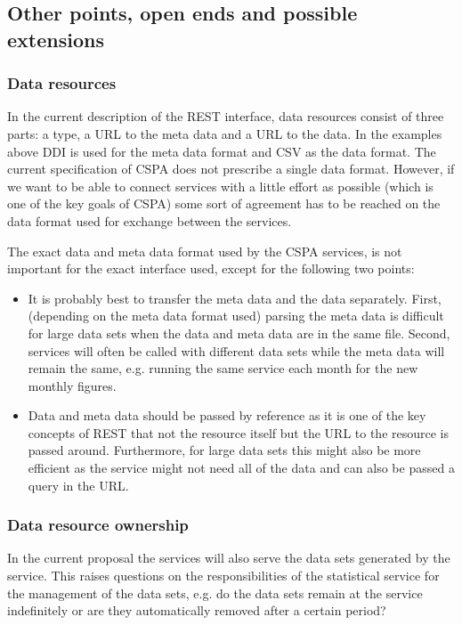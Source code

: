 \documentclass[a4paper]{article}
\begin{document}
\subsection{Other points, open ends and possible extensions}

\subsubsection{Data resources}
\label{sec:dataresources}
In the current description of the REST interface, data resources consist of
three parts: a type, a URL to the meta data and a URL to the data. In the
examples above DDI is used for the meta data format and CSV as the data format.
The current specification of CSPA does not prescribe a single data format.
However, if we want to be able to connect services with a little effort as
possible (which is one of the key goals of CSPA) some sort of agreement has to
be reached on the data format used for exchange between the services. 

The exact data and meta data format used by the CSPA services, is not important
for the exact interface used, except for the following two points:
\begin{itemize}
  \item It is probably best to transfer the meta data and the data separately.
  First, (depending on the meta data format used) parsing the meta data is
  difficult for large data sets when the data and meta data are in the same
  file. Second, services will often be called with different data sets while the
  meta data will remain the same, e.g. running the same service each month for
  the new monthly figures. 
  \item Data and meta data should be passed by reference as it is one of the key
  concepts of REST that not the resource itself but the URL to the resource is
  passed around. Furthermore, for large data sets this might also be more
  efficient as the service might not need all of the data and can also be passed
  a query in the URL.
\end{itemize}

\subsubsection{Data resource ownership}
In the current proposal the services will also serve the data sets generated by
the service. This raises questions on the responsibilities of the statistical
service for the management of the data sets, e.g. do the data sets remain at the
service indefinitely or are they automatically removed after a certain period? 
\end{document}
